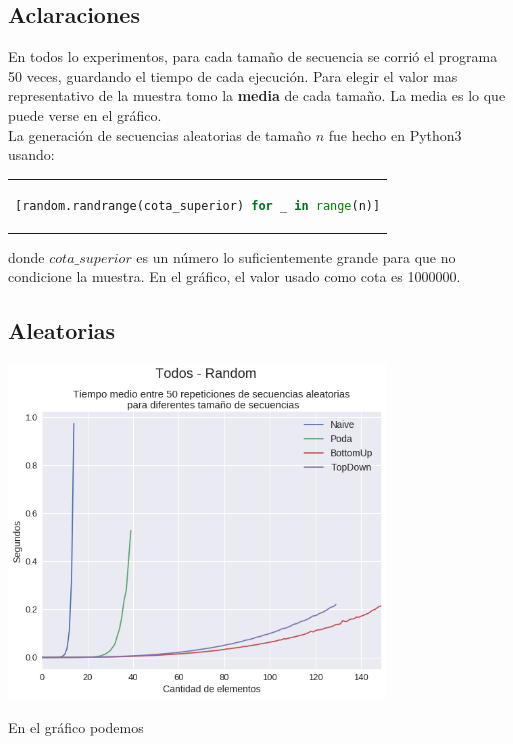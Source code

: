 \subsection{Aclaraciones}
En todos lo experimentos, para cada tamaño de secuencia se corrió el programa 50 veces, guardando el tiempo de cada ejecución. Para elegir el valor mas representativo de la muestra tomo la \textbf{media} de cada tamaño. La media es lo que puede verse en el gráfico. \\

La generación de secuencias aleatorias de tamaño $n$ fue hecho en Python3 usando: 
\begin{center}
\begin{tabular}{c}
\begin{lstlisting}[language=Python]
[random.randrange(cota_superior) for _ in range(n)]
\end{lstlisting}
\end{tabular}
\end{center}

donde $cota\_superior$ es un número lo suficientemente grande para que no condicione la muestra. En el gráfico, el valor usado como cota es 1000000. \\

\subsection{Aleatorias}

{\centering
  \includegraphics[width=0.75\textwidth]{informe/img/experimentos/todos-random.png} \\
}
\hspace{1\textwidth}

En el gráfico podemos